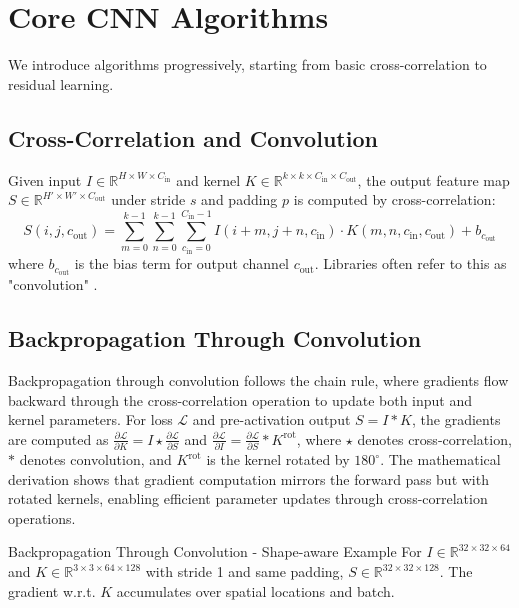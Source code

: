 
\section{Core CNN Algorithms }
\label{sec:cnn-algorithms}

We introduce algorithms progressively, starting from basic cross-correlation to residual learning.

\subsection{Cross-Correlation and Convolution}
Given input $I\in\mathbb{R}^{H\times W\times C_{\text{in}}}$ and kernel $K\in\mathbb{R}^{k\times k\times C_{\text{in}}\times C_{\text{out}}}$, the output feature map $S\in\mathbb{R}^{H'\times W'\times C_{\text{out}}}$ under stride $s$ and padding $p$ is computed by cross-correlation:
\begin{equation}
S(i,j,c_{\text{out}}) = \sum_{m=0}^{k-1} \sum_{n=0}^{k-1} \sum_{c_{\text{in}}=0}^{C_{\text{in}}-1} I(i+m, j+n, c_{\text{in}}) \cdot K(m, n, c_{\text{in}}, c_{\text{out}}) + b_{c_{\text{out}}}
\end{equation}
where $b_{c_{\text{out}}}$ is the bias term for output channel $c_{\text{out}}$. Libraries often refer to this as "convolution" \cite{GoodfellowEtAl2016}.

\subsection{Backpropagation Through Convolution}
Backpropagation through convolution follows the chain rule, where gradients flow backward through the cross-correlation operation to update both input and kernel parameters. For loss $\mathcal{L}$ and pre-activation output $S = I * K$, the gradients are computed as $\frac{\partial \mathcal{L}}{\partial K} = I \star \frac{\partial \mathcal{L}}{\partial S}$ and $\frac{\partial \mathcal{L}}{\partial I} = \frac{\partial \mathcal{L}}{\partial S} * K^\text{rot}$, where $\star$ denotes cross-correlation, $*$ denotes convolution, and $K^\text{rot}$ is the kernel rotated by $180^{\circ}$. The mathematical derivation shows that gradient computation mirrors the forward pass but with rotated kernels, enabling efficient parameter updates through cross-correlation operations.\cite{GoodfellowEtAl2016}

\begin{examplebox}{Backpropagation Through Convolution - Shape-aware Example}
For $I\in\mathbb{R}^{32\times32\times 64}$ and $K\in\mathbb{R}^{3\times3\times64\times128}$ with stride 1 and same padding, $S\in\mathbb{R}^{32\times32\times128}$. The gradient w.r.t. $K$ accumulates over spatial locations and batch.
\end{examplebox}


